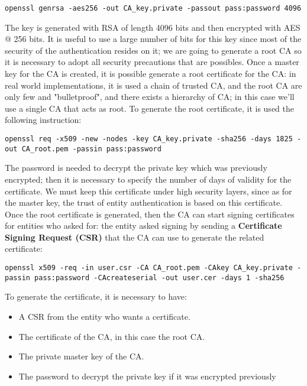 \documentclass{article}
\begin{document}
\begin{lstlisting}[breaklines]
openssl genrsa -aes256 -out CA_key.private -passout pass:password 4096
\end{lstlisting}

The key is generated with RSA of length 4096 bits and then encrypted with AES @ 256 bits. It is useful to use a large number of bits for this key since most of the security of the authentication resides on it; we are going to generate a root CA so it is necessary to adopt all security precautions that are possibles. Once a master key for the CA is created, it is possible generate a root certificate for the CA: in real world implementations, it is used a chain of trusted CA, and the root CA are only few and "bulletproof", and there exists a hierarchy of CA; in this case we'll use a single CA that acts as root. To generate the root certificate, it is used the following instruction:  

\begin{lstlisting}[breaklines]
openssl req -x509 -new -nodes -key CA_key.private -sha256 -days 1825 -out CA_root.pem -passin pass:password
\end{lstlisting}

The password is needed to decrypt the private key which was previously encrypted; then it is necessary to specify the number of days of validity for the certificate. We must keep this certificate under high security layers, since as for the master key, the trust of entity authentication is based on this certificate. Once the root certificate is generated, then the CA can start signing certificates for entities who asked for: the entity asked signing by sending a \textbf{Certificate Signing Request (CSR)} that the CA can use to generate the related certificate:

\begin{lstlisting}[breaklines]
openssl x509 -req -in user.csr -CA CA_root.pem -CAkey CA_key.private -passin pass:password -CAcreateserial -out user.cer -days 1 -sha256
\end{lstlisting}

To generate the certificate, it is necessary to have: 

\begin{itemize}
	\item A CSR from the entity who wants a certificate.
	\item The certificate of the CA, in this case the root CA.
	\item The private master key of the CA.
	\item The password to decrypt the private key if it was encrypted previously
\end{itemize}
\end{document}
